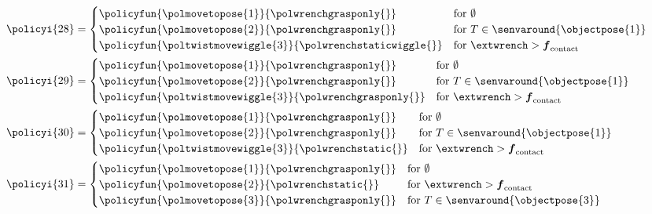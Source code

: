 \begin{align*}
&\policyi{28}=\begin{cases}
\policyfun{\polmovetopose{1}}{\polwrenchgrasponly{}} & \text{for } \emptyset \\
\policyfun{\polmovetopose{2}}{\polwrenchgrasponly{}} & \text{for } T \in \senvaround{\objectpose{1}} \\
\policyfun{\poltwistmovewiggle{3}}{\polwrenchstaticwiggle{}} & \text{for } \extwrench > \boldsymbol{f}_\text{contact}
\end{cases}\\
&\policyi{29}=\begin{cases}
\policyfun{\polmovetopose{1}}{\polwrenchgrasponly{}} & \text{for } \emptyset \\
\policyfun{\polmovetopose{2}}{\polwrenchgrasponly{}} & \text{for } T \in \senvaround{\objectpose{1}} \\
\policyfun{\poltwistmovewiggle{3}}{\polwrenchgrasponly{}} & \text{for } \extwrench > \boldsymbol{f}_\text{contact}
\end{cases}\\
&\policyi{30}=\begin{cases}
\policyfun{\polmovetopose{1}}{\polwrenchgrasponly{}} & \text{for } \emptyset \\
\policyfun{\polmovetopose{2}}{\polwrenchgrasponly{}} & \text{for } T \in \senvaround{\objectpose{1}} \\
\policyfun{\poltwistmovewiggle{3}}{\polwrenchstatic{}} & \text{for } \extwrench > \boldsymbol{f}_\text{contact}
\end{cases}\\
&\policyi{31}=\begin{cases}
\policyfun{\polmovetopose{1}}{\polwrenchgrasponly{}} & \text{for } \emptyset \\
\policyfun{\polmovetopose{2}}{\polwrenchstatic{}} & \text{for } \extwrench > \boldsymbol{f}_\text{contact} \\
\policyfun{\polmovetopose{3}}{\polwrenchgrasponly{}} & \text{for } T \in \senvaround{\objectpose{3}}
\end{cases}
\end{align*}



